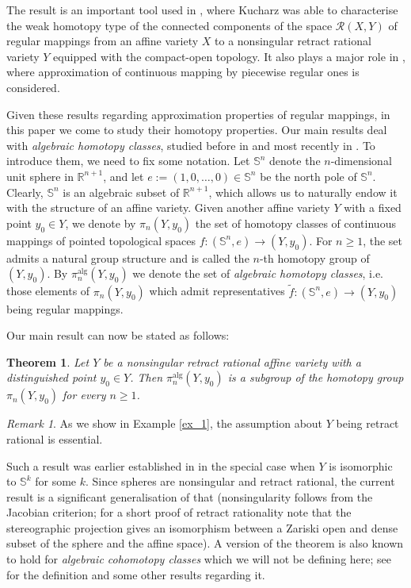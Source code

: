 \documentclass{article}
\theoremstyle{plain}
\newtheorem{thm}{Theorem}[section]
\theoremstyle{definition}
\theoremstyle{remark}
\newtheorem{rem}{Remark}[thm]
\newcommand{\R}{\mathbb{R}}
\newcommand{\RR}{\mathcal{R}}
\newcommand{\s}{\mathbb{S}}
\newcommand{\alg}{\mathrm{alg}}
\begin{document}
The result is an important tool used in \cite{kucharzSpacesMapsReal2025}, where Kucharz was able to characterise the weak homotopy type of the connected components of the space $\RR(X,Y)$ of regular mappings from an affine variety $X$ to a nonsingular retract rational variety $Y$ equipped with the compact-open topology. It also plays a major role in \cite{bilskiApproximationMapsAlgebraic2025}, where approximation of continuous mapping by piecewise regular ones is considered.

Given these results regarding approximation properties of regular mappings, in this paper we come to study their homotopy properties. Our main results deal with \emph{algebraic homotopy classes}, studied before in \cite{bochnakAlgebraicApproximationMappings1987,bochnakRealizationHomotopyClasses1987,pengAlgebraicMapsSpheres1999} and most recently in \cite{baneckiAlgebraicHomotopyClasses2024,golasinskiSpheresFieldsTheir2024}. To introduce them, we need to fix some notation. Let $\s^n$ denote the $n$-dimensional unit sphere in $\R^{n+1}$, and let $e:=(1,0,\dots,0)\in\s^n$ be the north pole of $\s^n$. Clearly, $\s^n$ is an algebraic subset of $\R^{n+1}$, which allows us to naturally endow it with the structure of an affine variety. Given another affine variety $Y$ with a fixed point $y_0\in Y$, we denote by $\pi_n(Y,y_0)$ the set of homotopy classes of continuous mappings of pointed topological spaces $f:(\s^n,e)\rightarrow (Y,y_0)$. For $n\geq 1$, the set admits a natural group structure and is called the $n$-th homotopy group of $(Y,y_0)$. By $\pi_n^\alg(Y,y_0)$ we denote the set of \emph{algebraic homotopy classes}, i.e. those elements of $\pi_n(Y,y_0)$ which admit representatives $\tilde{f}:(\s^n,e)\rightarrow (Y,y_0)$ being regular mappings. 

Our main result can now be stated as follows:
\begin{thm}\label{thm_groups}
Let $Y$ be a nonsingular retract rational affine variety with a distinguished point $y_0\in Y$. Then $\pi_n^\alg(Y,y_0)$ is a subgroup of the homotopy group $\pi_n(Y,y_0)$ for every $n\geq 1$.
\end{thm}
\begin{rem}
As we show in Example \ref{ex_1}, the assumption about $Y$ being retract rational is essential.
\end{rem}

Such a result was earlier established in \cite[Theorem 1.1]{baneckiAlgebraicHomotopyClasses2024} in the special case when $Y$ is isomorphic to $\s^k$ for some $k$. Since spheres are nonsingular and retract rational, the current result is a significant generalisation of that (nonsingularity follows from the Jacobian criterion; for a short proof of retract rationality note that the stereographic projection gives an isomorphism between a Zariski open and dense subset of the sphere and the affine space). A version of the theorem is also known to hold for \emph{algebraic cohomotopy classes} which we will not be defining here; see \cite{baneckiAlgebraicHomotopyClasses2024} for the definition and some other results regarding it.
\end{document}
